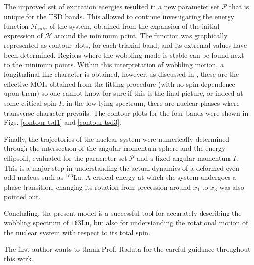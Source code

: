 \documentclass[%
 reprint,
 amsmath,
 amssymb,
 aps,
 floatfix,
]{revtex4-2}
\begin{document}
The improved set of excitation energies resulted in a new parameter set $\mathcal{P}$ that is unique for the TSD bands. This allowed to continue investigating the energy function $\mathcal{H}_{min}$ of the system, obtained from the expansion of the initial expression of $\mathcal{H}$ around the minimum point. The function was graphically represented as contour plots, for each triaxial band, and its extremal values have been determined. Regions where the wobbling mode is stable can be found next to the minimum points. Within this interpretation of wobbling motion, a longitudinal-like character is obtained, however, as discussed in \cite{raduta2020new}, these are the effective MOIs obtained from the fitting procedure (with no spin-dependence upon them) so one cannot know for sure if this is the final picture, or indeed at some critical spin $I_c$ in the low-lying spectrum, there are nuclear phases where transverse character prevails. The contour plots for the four bands were shown in Figs. \ref{contour-tsd1} and \ref{contour-tsd3}.

Finally, the trajectories of the nuclear system were numerically determined through the intersection of the angular momentum sphere and the energy ellipsoid, evaluated for the parameter set $\mathcal{P}$ and a fixed angular momentum $I$. This is a major step in understanding the actual dynamics of a deformed even-odd nucleus such as $^{163}$Lu. A critical energy at which the system undergoes a phase transition, changing its rotation from precession around $x_1$ to $x_3$ was also pointed out.

Concluding, the present model is a successful tool for accurately describing the wobbling spectrum of ${163}$Lu, but also for understanding the rotational motion of the nuclear system with respect to its total spin.



The first author wants to thank Prof. Raduta for the careful guidance throughout this work.

\end{document}
